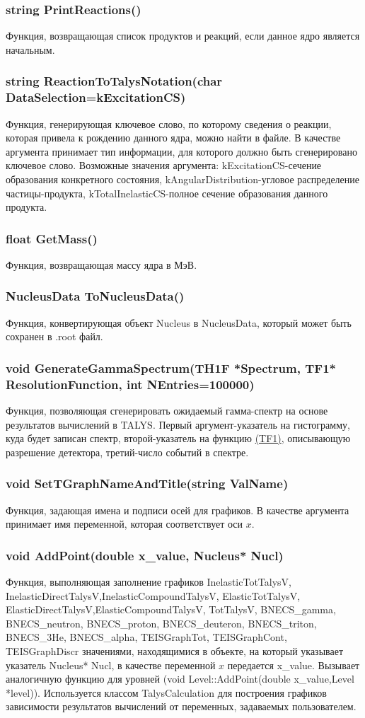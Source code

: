 \documentclass[a4paper,12pt]{extarticle}
\begin{document}
\subsubsection{string PrintReactions()}
Функция, возвращающая список продуктов и реакций, если данное ядро является начальным.
\subsubsection{string ReactionToTalysNotation(char DataSelection=kExcitationCS)}
Функция, генерирующая ключевое слово, по которому сведения о реакции, которая привела к рождению данного ядра, можно найти в файле. В качестве аргумента принимает тип информации, для которого должно быть сгенерировано ключевое слово. Возможные значения аргумента: kExcitationCS-сечение образования конкретного состояния, kAngularDistribution-угловое распределение частицы-продукта, kTotalInelasticCS-полное сечение образования данного продукта.
\subsubsection{float GetMass()}
Функция, возвращающая массу ядра в МэВ.
\subsubsection{NucleusData ToNucleusData()}
Функция, конвертирующая объект Nucleus в NucleusData, который может быть сохранен в .root файл.
\subsubsection{void GenerateGammaSpectrum(TH1F *Spectrum, TF1* ResolutionFunction, int NEntries=100000)}
Функция, позволяющая сгенерировать ожидаемый гамма-спектр на основе результатов вычислений в TALYS. Первый аргумент-указатель на гистограмму, куда будет записан спектр, второй-указатель на функцию \href{https://root.cern.ch/doc/master/classTF1.html}{(TF1)}, описывающую разрешение детектора, третий-число событий в спектре.
\subsubsection{void SetTGraphNameAndTitle(string ValName)}
Функция, задающая имена и подписи осей для графиков. В качестве аргумента принимает имя переменной, которая соответствует оси $x$.
\subsubsection{void AddPoint(double x_value, Nucleus* Nucl)}
Функция, выполняющая заполнение графиков InelasticTotTalysV, InelasticDirectTalysV,InelasticCompoundTalysV, ElasticTotTalysV, ElasticDirectTalysV,ElasticCompoundTalysV, TotTalysV, BNECS_gamma, BNECS_neutron, BNECS_proton, BNECS_deuteron, BNECS_triton, BNECS_3He, BNECS_alpha, TEISGraphTot, TEISGraphCont, TEISGraphDiscr значениями, находящимися в объекте, на который указывает указатель Nucleus* Nucl, в качестве переменной $x$ передается x_value. Вызывает аналогичную функцию для уровней (void Level::AddPoint(double x_value,Level *level)). Используется классом TalysCalculation для построения графиков зависимости результатов вычислений от переменных, задаваемых пользователем.
\end{document}
